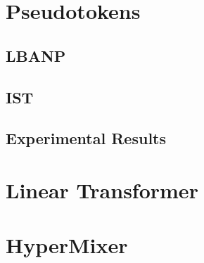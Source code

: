 \documentclass[../../main.tex]{subfiles}
\begin{document}
\section{Pseudotokens}

\subsection{LBANP}
\subsection{IST}
\subsection{Experimental Results}

\section{Linear Transformer}

\section{HyperMixer}



\ifSubfilesClassLoaded{%
    \printbibliography{}
}{} 
\end{document}
